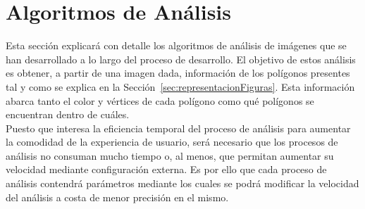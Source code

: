 \section{Algoritmos de Análisis}
\label{sec:algAnalisis}

Esta sección explicará con detalle los algoritmos de análisis de imágenes que se han desarrollado a lo largo del proceso de desarrollo. El objetivo de estos análisis es obtener, a partir de una imagen dada, información de los polígonos presentes tal y como se explica en la Sección~\ref{sec:representacionFiguras}. Esta información abarca tanto el color y vértices de cada polígono como qué polígonos se encuentran dentro de cuáles.\\

Puesto que interesa la eficiencia temporal del proceso de análisis para aumentar la comodidad de la experiencia de usuario, será necesario que los procesos de análisis no consuman mucho tiempo o, al menos, que permitan aumentar su velocidad mediante configuración externa. Es por ello que cada proceso de análisis contendrá parámetros mediante los cuales se podrá modificar la velocidad del análisis a costa de menor precisión en el mismo.\\

